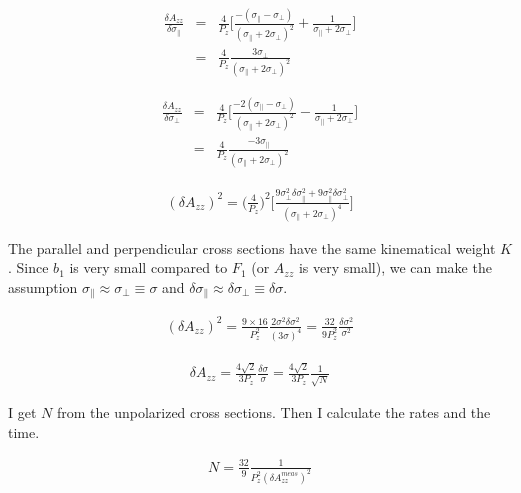 \documentclass[11pt]{article}
\begin{document}
\begin{eqnarray}
\frac{\delta A_{zz}}{\delta \sigma_{\parallel}} & = &\frac{4}{P_z} \Bigg[\frac{- (\sigma_{\parallel} - \sigma_{\perp})}{(\sigma_{\parallel} + 2 \sigma_{\perp})^2} + \frac{1}{\sigma_{\parallel} + 2 \sigma_{\perp}} \Bigg] \\
         & = & \frac{4}{P_z} \frac{3 \sigma_{\perp}}{(\sigma_{\parallel} + 2 \sigma_{\perp})^2}
\label{none} 
\end{eqnarray}


\begin{eqnarray}
\frac{\delta A_{zz}}{\delta \sigma_{\perp}} & = &\frac{4}{P_z} \Bigg[\frac{- 2 (\sigma_{\parallel} - \sigma_{\perp})}{(\sigma_{\parallel} + 2 \sigma_{\perp})^2} - \frac{1}{\sigma_{\parallel} + 2 \sigma_{\perp}} \Bigg] \\
         & = & \frac{4}{P_z} \frac{-3 \sigma_{\parallel}}{(\sigma_{\parallel} + 2 \sigma_{\perp})^2}
\label{none} 
\end{eqnarray}

\begin{eqnarray}
(\delta A_{zz})^2 = \Bigg(\frac{4}{P_z}\Bigg)^2 \Bigg[ \frac{9 \sigma_{\perp}^2 \delta \sigma_{\parallel}^2 + 9\sigma_{\parallel}^2 \delta \sigma_{\perp}^2 }{(\sigma_{\parallel} + 2 \sigma_{\perp})^4} \Bigg]
\label{none} 
\end{eqnarray}

The parallel and perpendicular cross sections have the same kinematical weight $K$. Since $b_1$ is very small compared to $F_1$ (or $A_{zz}$ is very small), we can make the assumption $\sigma_{\parallel} \approx \sigma_{\perp} \equiv \sigma$ and  $\delta \sigma_{\parallel} \approx  \delta \sigma_{\perp} \equiv \delta \sigma$. 

\begin{eqnarray}
(\delta A_{zz})^2 = \frac{9 \times 16}{P_z^2} \frac{2 \sigma^2 \delta \sigma^2}{(3 \sigma)^4} = \frac{32}{9 P_z^2} \frac{\delta \sigma^2}{\sigma^2}
\label{none} 
\end{eqnarray}

\begin{eqnarray}
\delta A_{zz} = \frac{4 \sqrt{2}}{3 P_z} \frac{\delta \sigma}{\sigma} =  \frac{4 \sqrt{2}}{3 P_z} \frac{1}{\sqrt{N}}
\label{none} 
\end{eqnarray}

I get $N$ from the unpolarized cross sections. Then I calculate the rates and the time.

\begin{eqnarray}
N = \frac{32}{9} \frac{1}{P_z^2 (\delta A_{zz}^{meas})^2}
\label{none} 
\end{eqnarray}
\end{document}
